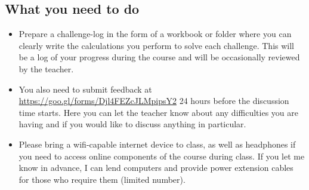 \subsection{What you need to do}
\begin{itemize}
    \item Prepare a challenge-log in the form of a workbook or folder where you can clearly write the calculations you perform to solve each challenge. This will be a log of your progress during the course and will be occasionally reviewed by the teacher.
    \item You also need to submit feedback at \url{https://goo.gl/forms/Djl4FEZcJLMpipsY2} 24 hours before the discussion time starts. Here you can let the teacher know about any difficulties you are having and if you would like to discuss anything in particular.
    \item Please bring a wifi-capable internet device to class, as well as headphones if you need to access online components of the course during class. If you let me know in advance, I can lend computers and provide power extension cables for those who require them (limited number).
\end{itemize}
